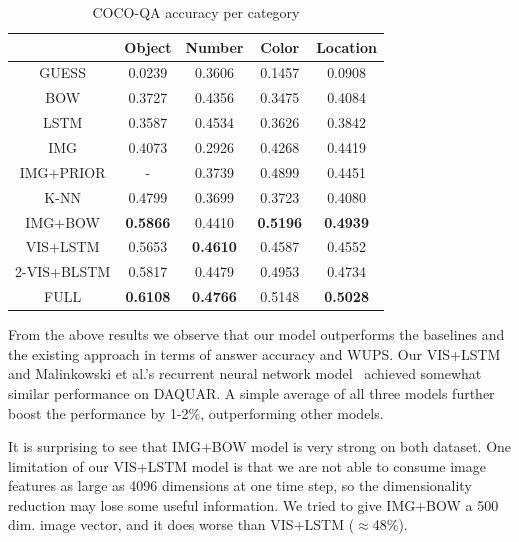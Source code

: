 \documentclass{article} %
\renewcommand{\#}[1]{\textbf{#1}}
\begin{document}
\begin{table}[h]
\caption{COCO-QA accuracy per category}
\label{tab:cocoqa_acc_breakdown}
\begin{center}
\begin{small}
\begin{sc}
\begin{tabular}{c c c c c}
\hline
           &   Object  &   Number &   Color   & Location \\
\hline
GUESS      &   0.0239  &   0.3606 &   0.1457  & 0.0908   \\
BOW        &   0.3727  &   0.4356 &   0.3475  & 0.4084   \\
LSTM       &   0.3587  &   0.4534 &   0.3626  & 0.3842   \\
IMG        &   0.4073  &   0.2926 &   0.4268  & 0.4419   \\
IMG+PRIOR  &   -       &   0.3739 &   0.4899  & 0.4451   \\
K-NN       &   0.4799  &   0.3699 &   0.3723  & 0.4080   \\
IMG+BOW    &\#{0.5866} &   0.4410 &\#{0.5196} &\#{0.4939}\\
VIS+LSTM   &   0.5653  &\#{0.4610}&   0.4587  & 0.4552   \\
2-VIS+BLSTM&   0.5817  &   0.4479 &   0.4953  & 0.4734   \\
FULL       &\#{0.6108} &\#{0.4766}&   0.5148  &\#{0.5028}\\
\hline
\end{tabular}
\end{sc}
\end{small}
\end{center}
\end{table}

From the above results we observe that our model outperforms the baselines and
the existing approach in terms of answer accuracy and WUPS. Our VIS+LSTM and
Malinkowski et al.'s recurrent neural network model~\cite{malinowski15} achieved
somewhat similar performance on DAQUAR. A simple average of all three models
further boost the performance by 1-2\%, outperforming other models.

It is surprising to see that IMG+BOW model is very strong on both dataset. One
limitation of our VIS+LSTM model is that we are not able to consume image
features as large as 4096 dimensions at one time step, so the dimensionality
reduction may lose some useful information. We tried to give IMG+BOW a 500 dim.
image vector, and it does worse than VIS+LSTM ($\approx$48\%). 
\end{document}
